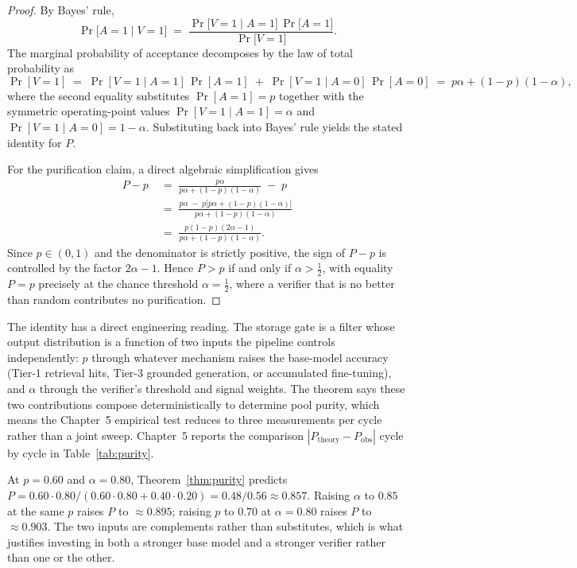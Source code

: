 \begin{proof}
By Bayes' rule,
\[
    \Pr\!\big[A = 1 \mid V = 1\big] \;=\; \frac{\Pr\!\big[V = 1 \mid A = 1\big]\,\Pr\!\big[A = 1\big]}{\Pr\!\big[V = 1\big]}.
\]
The marginal probability of acceptance decomposes by the law of total probability as
\[
    \Pr[V = 1]
    \;=\; \Pr[V = 1 \mid A = 1]\,\Pr[A = 1] \;+\; \Pr[V = 1 \mid A = 0]\,\Pr[A = 0]
    \;=\; p\alpha + (1 - p)(1 - \alpha),
\]
where the second equality substitutes $\Pr[A=1] = p$ together with the symmetric operating-point values $\Pr[V = 1 \mid A = 1] = \alpha$ and $\Pr[V = 1 \mid A = 0] = 1 - \alpha$. Substituting back into Bayes' rule yields the stated identity for $P$.

For the purification claim, a direct algebraic simplification gives
\begin{align*}
    P - p
    &\;=\; \frac{p\alpha}{p\alpha + (1-p)(1-\alpha)} \;-\; p \\[2pt]
    &\;=\; \frac{p\alpha \;-\; p\bigl[p\alpha + (1-p)(1-\alpha)\bigr]}{p\alpha + (1-p)(1-\alpha)} \\[2pt]
    &\;=\; \frac{p(1-p)(2\alpha - 1)}{p\alpha + (1-p)(1-\alpha)}.
\end{align*}
Since $p \in (0, 1)$ and the denominator is strictly positive, the sign of $P - p$ is controlled by the factor $2\alpha - 1$. Hence $P > p$ if and only if $\alpha > \tfrac{1}{2}$, with equality $P = p$ precisely at the chance threshold $\alpha = \tfrac{1}{2}$, where a verifier that is no better than random contributes no purification.
\end{proof}

The identity has a direct engineering reading. The storage gate is a filter whose output distribution is a function of two inputs the pipeline controls independently: $p$ through whatever mechanism raises the base-model accuracy (Tier-1 retrieval hits, Tier-3 grounded generation, or accumulated fine-tuning), and $\alpha$ through the verifier's threshold and signal weights. The theorem says these two contributions compose deterministically to determine pool purity, which means the Chapter~5 empirical test reduces to three measurements per cycle rather than a joint sweep. Chapter~5 reports the comparison $|P_{\text{theory}} - P_{\text{obs}}|$ cycle by cycle in Table~\ref{tab:purity}.

\begin{remark}
At $p = 0.60$ and $\alpha = 0.80$, Theorem~\ref{thm:purity} predicts $P = 0.60 \cdot 0.80 / (0.60 \cdot 0.80 + 0.40 \cdot 0.20) = 0.48 / 0.56 \approx 0.857$. Raising $\alpha$ to $0.85$ at the same $p$ raises $P$ to $\approx 0.895$; raising $p$ to $0.70$ at $\alpha = 0.80$ raises $P$ to $\approx 0.903$. The two inputs are complements rather than substitutes, which is what justifies investing in both a stronger base model and a stronger verifier rather than one or the other.
\end{remark}

